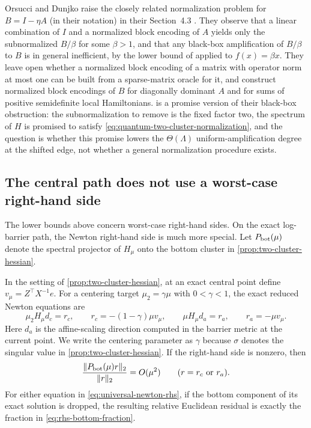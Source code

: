 Orsucci and Dunjko raise the closely related normalization problem for
$B=I-\eta A$ (in their notation) in their Section~4.3
\cite{orsucci2021-on-solving-classes-of-positive}.  They observe that a
linear combination of $I$ and a normalized block encoding of $A$ yields only
the subnormalized $B/\beta$ for some $\beta>1$, and that any black-box
amplification of $B/\beta$ to $B$ is in general inefficient, by the lower
bound of
\cite[Theorem~73]{andras2019-quantum-singular-value-transformation-beyond}
applied to $f(x)=\beta x$.  They leave open whether a normalized block
encoding of a matrix with operator norm at most one can be built from a
sparse-matrix oracle for it, and construct normalized block encodings of
$B$ for diagonally dominant $A$ and for sums of positive semidefinite local
Hamiltonians.
 is a promise version of their
black-box obstruction: the subnormalization to remove is the fixed factor
two, the spectrum of $H$ is promised to satisfy
\eqref{eq:quantum-two-cluster-normalization}, and the question is whether
this promise lowers the $\Theta(\Lambda)$ uniform-amplification degree at
the shifted edge, not whether a general normalization procedure exists.

\subsection{The central path does not use a worst-case right-hand side}
\label{sec:spectra-rhs}

The lower bounds above concern worst-case right-hand sides.  On the exact
log-barrier path, the Newton right-hand side is much more special.  Let
$P_{\rm bot}(\mu)$ denote the spectral projector of $H_\mu$ onto the bottom
cluster in \cref{prop:two-cluster-hessian}.

\begin{proposition}
\label{prop:newton-rhs-alignment}
In the setting of \cref{prop:two-cluster-hessian}, at an exact central point
define $v_\mu=Z^\top X^{-1}e$.  For a centering target
$\mu_2=\gamma\mu$ with $0<\gamma<1$, the exact reduced Newton equations are
\begin{equation}
 \mu_2H_\mu d_c=r_c,
 \qquad r_c=-(1-\gamma)\mu v_\mu,
 \qquad
 \mu H_\mu d_a=r_a,
 \qquad r_a=-\mu v_\mu.
 \label{eq:universal-newton-rhs}
\end{equation}
Here $d_a$ is the affine-scaling direction computed in the barrier metric
at the current point.  We write the centering parameter as $\gamma$ because
$\sigma$ denotes the singular value in \cref{prop:two-cluster-hessian}.  If the right-hand side is nonzero,
then
\begin{equation}
 \frac{\lVert P_{\rm bot}(\mu)r\rVert_2}{\lVert r\rVert_2}=O(\mu^2)
 \qquad(r=r_c\text{ or }r_a).
 \label{eq:rhs-bottom-fraction}
\end{equation}
For either equation in \eqref{eq:universal-newton-rhs}, if the bottom
component of its exact solution is dropped, the resulting relative
Euclidean residual is exactly the fraction in \eqref{eq:rhs-bottom-fraction}.
\end{proposition}

